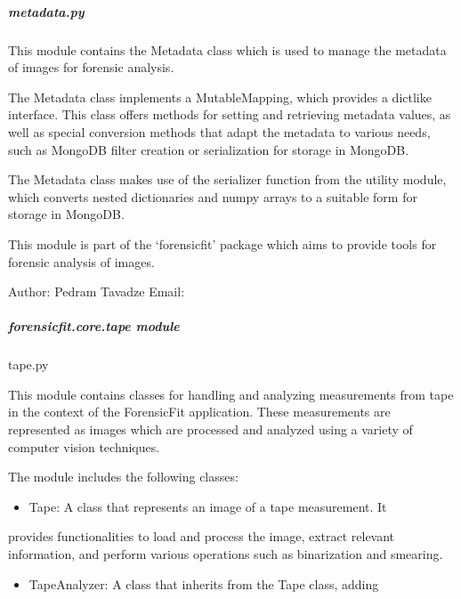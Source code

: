 \documentclass[letterpaper,10pt,english]{sphinxmanual}
\begin{document}
\subparagraph{metadata.py}
\label{\detokenize{forensicfit.core.metadata:metadata-py}}
\sphinxAtStartPar
This module contains the Metadata class which is used to manage the metadata of images for forensic analysis.

\sphinxAtStartPar
The Metadata class implements a MutableMapping, which provides a dict\sphinxhyphen{}like interface. This class offers methods
for setting and retrieving metadata values, as well as special conversion methods that adapt the metadata to various
needs, such as MongoDB filter creation or serialization for storage in MongoDB.

\sphinxAtStartPar
The Metadata class makes use of the serializer function from the  utility module, which converts nested
dictionaries and numpy arrays to a suitable form for storage in MongoDB.

\sphinxAtStartPar
This module is part of the ‘forensicfit’ package which aims to provide tools for forensic analysis of images.

\sphinxAtStartPar
Author: Pedram Tavadze
Email: 

\sphinxstepscope


\subparagraph{forensicfit.core.tape module}
\label{\detokenize{forensicfit.core.tape:module-forensicfit.core.tape}}\label{\detokenize{forensicfit.core.tape:forensicfit-core-tape-module}}\label{\detokenize{forensicfit.core.tape::doc}}
\sphinxAtStartPar
tape.py

\sphinxAtStartPar
This module contains classes for handling and analyzing measurements
from tape in the context of the ForensicFit application. These
measurements are represented as images which are processed and
analyzed using a variety of computer vision techniques.

\sphinxAtStartPar
The module includes the following classes:
\begin{itemize}
\item {} 
\sphinxAtStartPar
Tape: A class that represents an image of a tape measurement. It

\end{itemize}

\sphinxAtStartPar
provides functionalities to load and process the image, extract
relevant information, and perform various operations such as
binarization and smearing.
\begin{itemize}
\item {} 
\sphinxAtStartPar
TapeAnalyzer: A class that inherits from the Tape class, adding

\end{itemize}
\end{document}
